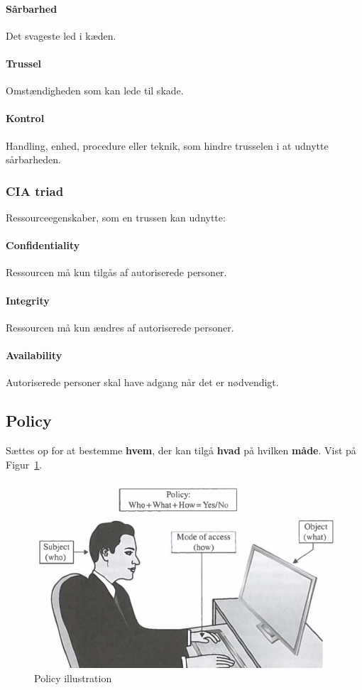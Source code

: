 \paragraph{Sårbarhed}
Det svageste led i kæden.

\paragraph{Trussel}
Omstændigheden som kan lede til skade.

\paragraph{Kontrol}
Handling, enhed, procedure eller teknik, som hindre trusselen i at udnytte sårbarheden.

\subsubsection{CIA triad}
Ressourceegenskaber, som en trussen kan udnytte:

\paragraph{Confidentiality}
Ressourcen må kun tilgås af autoriserede personer.

\paragraph{Integrity}
Ressourcen må kun ændres af autoriserede personer. 

\paragraph{Availability}
Autoriserede personer skal have adgang når det er nødvendigt.

\subsection{Policy}
Sættes op for at bestemme \textbf{hvem}, der kan tilgå \textbf{hvad} på hvilken \textbf{måde}. Vist på Figur~\ref{fig:policy}. 

\begin{figure}[H]
	\centering
	\includegraphics[width=0.8\linewidth]{figs/spm1/policy}
	\caption{Policy illustration}
	\label{fig:policy}
\end{figure}

